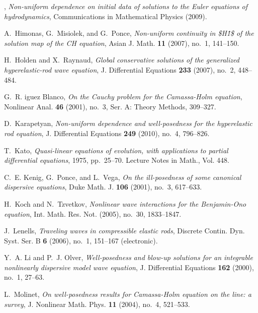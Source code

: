 \documentclass[12pt,reqno]{amsbook}
\numberwithin{section}{chapter}
\numberwithin{equation}{section}  %
\theoremstyle{remark}
\begin{document}
\begin{thebibliography}{HIKK10}
\bysame, \emph{{Non-uniform dependence on initial data of solutions to the
  Euler equations of hydrodynamics}}, Communications in Mathematical Physics
  (2009).

A.~Himonas, G.~Misiolek, and G.~Ponce, \emph{{Non-uniform continuity in {\$}H\^
  1{\$} of the solution map of the CH equation}}, Asian J. Math. \textbf{11}
  (2007), no.~1, 141--150.

H.~Holden and X.~Raynaud, \emph{{Global conservative solutions of the
  generalized hyperelastic-rod wave equation}}, J. Differential Equations
  \textbf{233} (2007), no.~2, 448--484.

G.~R. iguez Blanco, \emph{{On the Cauchy problem for the Camassa-Holm
  equation}}, Nonlinear Anal. \textbf{46} (2001), no.~3, Ser. A: Theory
  Methods, 309--327.

D.~Karapetyan, \emph{{Non-uniform dependence and well-posedness for the
  hyperelastic rod equation}}, J. Differential Equations \textbf{249} (2010),
  no.~4, 796--826.

T.~Kato, \emph{{Quasi-linear equations of evolution, with applications to
  partial differential equations}}, 1975, pp.~25--70. Lecture Notes in Math.,
  Vol. 448.

C.~E. Kenig, G.~Ponce, and L.~Vega, \emph{{On the ill-posedness of some
  canonical dispersive equations}}, Duke Math. J. \textbf{106} (2001), no.~3,
  617--633.

H.~Koch and N.~Tzvetkov, \emph{{Nonlinear wave interactions for the
  Benjamin-Ono equation}}, Int. Math. Res. Not. (2005), no.~30, 1833--1847.

J.~Lenells, \emph{{Traveling waves in compressible elastic rods}}, Discrete
  Contin. Dyn. Syst. Ser. B \textbf{6} (2006), no.~1, 151--167 (electronic).

Y.~A. Li and P.~J. Olver, \emph{{Well-posedness and blow-up solutions for an
  integrable nonlinearly dispersive model wave equation}}, J. Differential
  Equations \textbf{162} (2000), no.~1, 27--63.

L.~Molinet, \emph{{On well-posedness results for Camassa-Holm equation on the
  line: a survey}}, J. Nonlinear Math. Phys. \textbf{11} (2004), no.~4,
  521--533.


\end{thebibliography}
\end{document}
